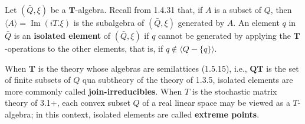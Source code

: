 Let $(\bar{Q}, \xi)$ be a $\mathbf{T}$-algebra. Recall from 1.4.31 that, if $A$ is a subset of $Q$, then $\langle A \rangle = \operatorname{Im}(iT.\xi)$ is the subalgebra of $(\bar{Q}, \xi)$ generated by $A$. An element $q$ in $\bar{Q}$ is an \textbf{isolated element} of $(\bar{Q}, \xi)$ if $q$ cannot be generated by applying the $\mathbf{T}$-operations to the other elements, that is, if $q \notin \langle Q - \{q\} \rangle$.

When $\mathbf{T}$ is the theory whose algebras are semilattices (1.5.15), i.e., $\mathbf{QT}$ is the set of finite subsets of $Q$ qua subtheory of the theory of 1.3.5, isolated elements are more commonly called \textbf{join-irreducibles}. When $T$ is the stochastic matrix theory of 3.1+, each convex subset $Q$ of a real linear space may be viewed as a $T$-algebra; in this context, isolated elements are called \textbf{extreme points}.
